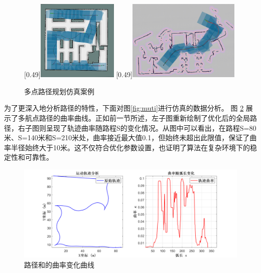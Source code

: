 \documentclass[master,academic]{ysuthesis} %
\begin{document}
		\begin{figure}[!ht]
			\centering
			[0.49\textwidth]{\includegraphics[width=0.344\textwidth]{muti.png}}
			[0.49\textwidth]{\includegraphics[width=0.48\textwidth]{dataminco.png}}
			\caption{多点路径规划仿真案例}
			\label{fig:多点路径规划仿真案例}
			\end{figure}
		
		为了更深入地分析路径的特性，下面对图\ref{fig:muti}进行仿真的数据分析。 图 \ref{fig:datamuti} 展示了多航点路径的曲率曲线。正如前一节所述，左子图重新绘制了优化后的全局路径，右子图则呈现了轨迹曲率随路程S的变化情况。从图中可以看出，在路程S=80米、S=140米和S=210米处，曲率接近最大值0.1，但始终未超出此限值，保证了曲率半径始终大于10米。这不仅符合优化参数设置，也证明了算法在复杂环境下的稳定性和可靠性。
		
		\begin{figure}[!ht]
		\centering
		\includegraphics[width=1\textwidth]{datamuti.png}
		\caption{路径和的曲率变化曲线}
		\label{fig:datamuti}
		\end{figure}
		
\end{document}
